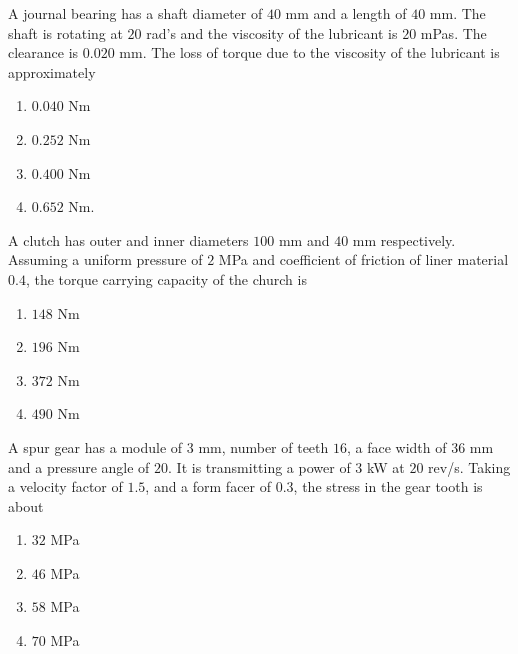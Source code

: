     \item A journal bearing has a shaft diameter of $40$ mm and a length of $40$ mm. The shaft is rotating at $20$ rad's and the viscosity of the lubricant is $20$ mPas. The clearance is $0.020$ mm. The loss of torque due to the viscosity of the lubricant is approximately
    \begin{multicols}{4}
    \begin{enumerate}
        \item $0.040$ Nm
        \item $0.252$ Nm
        \item $0.400$ Nm
        \item $0.652$ Nm.
    \end{enumerate}
    \end{multicols}

    \item A clutch has outer and inner diameters $100$ mm and $40$ mm respectively. Assuming a uniform pressure of $2$ MPa and coefficient of friction of liner material $0.4$, the torque carrying capacity of the church is
    \begin{multicols}{4}
    \begin{enumerate}
        \item $148$ Nm
        \item $196$ Nm
        \item $372$ Nm
        \item $490$ Nm 
    \end{enumerate}
    \end{multicols}

    \item A spur gear has a module of $3$ mm, number of teeth $16$, a face width of $36$ mm and a pressure angle of $20$. It is transmitting a power of $3$ kW at $20$ rev/s. Taking a velocity factor of $1.5$, and a form facer of $0.3$, the stress in the gear tooth is about
    \begin{multicols}{4}
    \begin{enumerate}
        \item $32$ MPa
        \item $46$ MPa
        \item $58$ MPa
        \item $70$ MPa
    \end{enumerate}
    \end{multicols}

